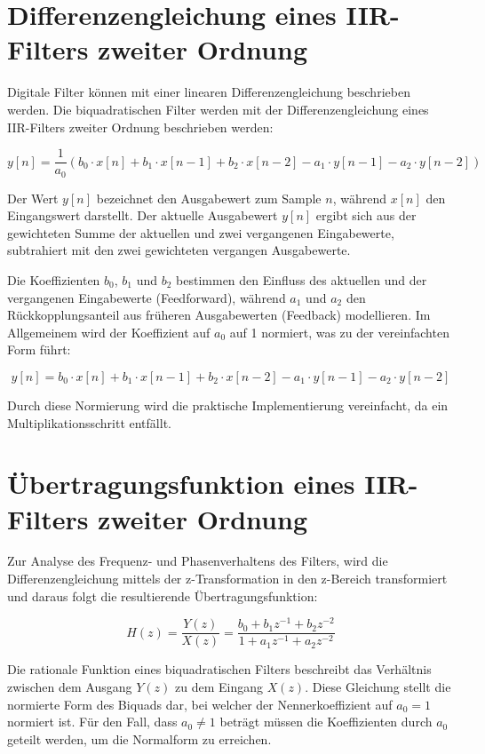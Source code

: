 \documentclass[
  ngerman,
  letterpaper,
  DIV=11]{scrreprt}
\begin{document}
\section{Differenzengleichung eines IIR-Filters zweiter
Ordnung}\label{differenzengleichung-eines-iir-filters-zweiter-ordnung}

Digitale Filter können mit einer linearen Differenzengleichung
beschrieben werden. Die biquadratischen Filter werden mit der
Differenzengleichung eines IIR-Filters zweiter Ordnung beschrieben
werden:

\[
y[n] =  \frac{1}{a_0}(b_0 \cdot x[n] + b_1 \cdot x[n - 1] + b_2 \cdot x[n - 2] - a_1 \cdot y[n - 1] - a_2 \cdot y[n - 2])
\]

Der Wert \(y[n]\) bezeichnet den Ausgabewert zum Sample \(n\), während
\(x[n]\) den Eingangswert darstellt. Der aktuelle Ausgabewert \(y[n]\)
ergibt sich aus der gewichteten Summe der aktuellen und zwei vergangenen
Eingabewerte, subtrahiert mit den zwei gewichteten vergangen
Ausgabewerte.

Die Koeffizienten \(b_0\), \(b_1\) und \(b_2\) bestimmen den Einfluss
des aktuellen und der vergangenen Eingabewerte (Feedforward), während
\(a_1\) und \(a_2\) den Rückkopplungsanteil aus früheren Ausgabewerten
(Feedback) modellieren. Im Allgemeinem wird der Koeffizient auf \(a_0\)
auf 1 normiert, was zu der vereinfachten Form führt:

\[
y[n] = b_0 \cdot x[n] + b_1 \cdot x[n - 1] + b_2 \cdot x[n - 2] - a_1 \cdot y[n - 1] - a_2 \cdot y[n - 2]
\]

Durch diese Normierung wird die praktische Implementierung vereinfacht,
da ein Multiplikationsschritt entfällt.

\section{Übertragungsfunktion eines IIR-Filters zweiter
Ordnung}\label{uxfcbertragungsfunktion-eines-iir-filters-zweiter-ordnung}

Zur Analyse des Frequenz- und Phasenverhaltens des Filters, wird die
Differenzengleichung mittels der z-Transformation in den z-Bereich
transformiert und daraus folgt die resultierende Übertragungsfunktion:

\[
H(z) = \frac{Y(z)}{X(z)} = \frac{b_0 + b_1 z^{-1} + b_2 z^{-2}}{1 + a_1 z^{-1} + a_2 z^{-2}}
\]

Die rationale Funktion eines biquadratischen Filters beschreibt das
Verhältnis zwischen dem Ausgang \(Y(z)\) zu dem Eingang \(X(z)\). Diese
Gleichung stellt die normierte Form des Biquads dar, bei welcher der
Nennerkoeffizient auf \(a_0 = 1\) normiert ist. Für den Fall, dass
\(a_0 ≠ 1\) beträgt müssen die Koeffizienten durch \(a_0\) geteilt
werden, um die Normalform zu erreichen.
\end{document}
